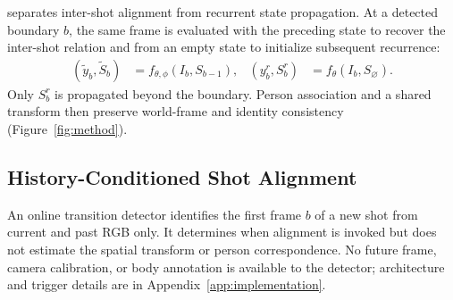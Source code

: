 \method{} separates inter-shot alignment from recurrent state propagation. At
a detected boundary $b$, the same frame is evaluated with the preceding state
to recover the inter-shot relation and from an empty state to initialize
subsequent recurrence:
\begin{equation}
\begin{aligned}
 (\widetilde y_b,\widetilde S_b)&=f_{\theta,\phi}(I_b,S_{b-1}), &
 (y_b^r,S_b^r)&=f_\theta(I_b,S_{\varnothing}).
\end{aligned}
\label{eq:boundary-paths}
\end{equation}
Only $S_b^r$ is propagated beyond the boundary. Person association and a
shared transform then preserve world-frame and identity consistency
(Figure~\ref{fig:method}).



\subsection{History-Conditioned Shot Alignment}

An online transition detector identifies the first frame $b$ of a new shot from
current and past RGB only. It determines when alignment is invoked but does not
estimate the spatial transform or person correspondence. No future frame,
camera calibration, or body annotation is available to the detector;
architecture and trigger details are in Appendix~\ref{app:implementation}.

